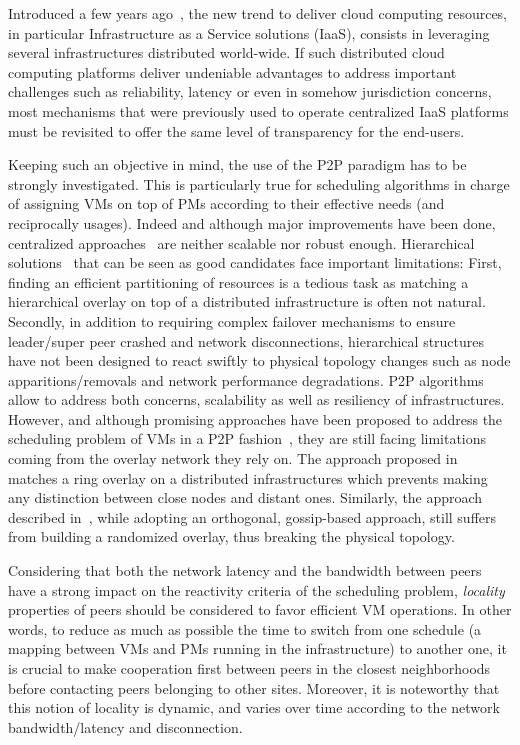 Introduced a few years ago~\cite{greenberg:sigcomm09}, the new trend to deliver cloud
computing resources, in particular Infrastructure as a Service solutions (IaaS), consists
in leveraging several infrastructures distributed world-wide. If such distributed cloud
computing platforms deliver undeniable advantages to address important challenges such as
reliability, latency or even in somehow jurisdiction concerns, most mechanisms that were
previously used to operate centralized IaaS platforms must be revisited to offer the same
level of transparency for the end-users.

Keeping such an objective in mind, the use of the P2P paradigm has to be strongly
investigated. This is particularly true for scheduling algorithms in charge
of assigning VMs on top of PMs according to their effective needs (and reciprocally
usages). Indeed and although major improvements have been done, centralized
approaches~\cite{hermenier:2013} are neither scalable nor robust enough. Hierarchical
solutions~\cite{feller:ccgrid12} that can be seen as good candidates face important
limitations: First, finding an efficient partitioning of resources is a tedious task as
matching a hierarchical overlay on top of a distributed infrastructure is often not
natural. Secondly, in addition to requiring complex failover mechanisms to ensure
leader/super peer crashed and network disconnections, hierarchical structures have not
been designed to react swiftly to physical topology changes such as node
apparitions/removals and network performance degradations. P2P algorithms allow to
address both concerns, \ie scalability as well as resiliency of infrastructures. However,
and although promising approaches have been proposed to address the scheduling problem of
VMs in a P2P fashion~\cite{quesnel:cpe2012,feller:cloudcom12}, they are still facing
limitations coming from the overlay network they rely on. The approach proposed
in~\cite{quesnel:cpe2012} matches a ring overlay on a distributed infrastructures which
prevents making any distinction between close nodes and distant ones. Similarly, the
approach described in~\cite{feller:cloudcom12}, while adopting an orthogonal, gossip-based approach,
still suffers from building a randomized overlay, thus breaking the physical topology.

Considering that both the network latency and the bandwidth between peers have a strong
impact on the reactivity criteria of the scheduling problem, \emph{locality} properties of
peers should be considered to favor efficient VM operations. In other words, to reduce as
much as possible the time to switch from one schedule (\ie a mapping between VMs and PMs
running in the infrastructure) to another one, it is crucial to make cooperation first
between peers in the closest neighborhoods before contacting peers belonging to other sites.
Moreover, it is noteworthy that this notion of locality is dynamic, and varies over time according
to the network bandwidth/latency and disconnection.

